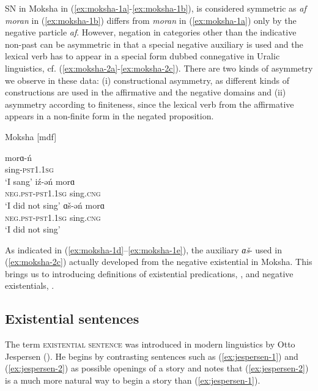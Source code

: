 \documentclass[output=paper,chinesefont,colorlinks,citecolor=brown]{langscibook}
\begin{document}
SN in Moksha in (\ref{ex:moksha-1a}-\ref{ex:moksha-1b}), is considered symmetric as \textit{af moran} in (\ref{ex:moksha-1b}) differs from \textit{moran} in (\ref{ex:moksha-1a}) only by the negative particle \textit{af}. However, negation in categories other than the indicative non-past can be asymmetric in that a special negative auxiliary is used and the lexical verb has to appear in a special form dubbed connegative in Uralic linguistics, cf. (\ref{ex:moksha-2a}-\ref{ex:moksha-2c}). There are two kinds of asymmetry we observe in these data:
(i) constructional asymmetry, as different kinds of constructions are used in the affirmative and the negative domains and
(ii) asymmetry according to finiteness, since the lexical verb from the affirmative appears in a non-finite form in the negated proposition.

\begin{exe}\ex Moksha [mdf]  \label{ex:moksha-2}
\begin{xlist}
\ex \label{ex:moksha-2a}
\gll morɑ-ń\\
sing-\textsc{pst1.1sg}\\
\glt ‘I sang'
\ex \label{ex:moksha-2b}
\gll iź-ǝń morɑ\\
\textsc{neg.pst}-\textsc{pst1.1sg} sing.\textsc{cng}\\
\glt ‘I did not sing’
\ex \label{ex:moksha-2c}
\gll ɑš-ǝń morɑ\\
\textsc{neg.pst}-\textsc{pst1.1sg} sing.\textsc{cng}\\
\glt ‘I did not sing’
    
    
\end{xlist}

\end{exe}
As indicated in (\ref{ex:moksha-1d}--\ref{ex:moksha-1e}), the auxiliary \textit{ɑš}- used in (\ref{ex:moksha-2c}) actually developed from the negative existential in Moksha. This brings us to introducing definitions of existential predications, , and negative existentials, .

\subsection{Existential sentences}\label{sect:existentials}\label{sec:intro:2.2}
The term \textsc{existential sentence} was introduced in modern linguistics by Otto Jespersen (\citeyear[154--156]{jespersen1924}). He begins by contrasting sentences such as (\ref{ex:jespersen-1}) and (\ref{ex:jespersen-2}) as possible openings of a story and notes that (\ref{ex:jespersen-2}) is a much more natural way to begin a story than (\ref{ex:jespersen-1}).
\end{document}
